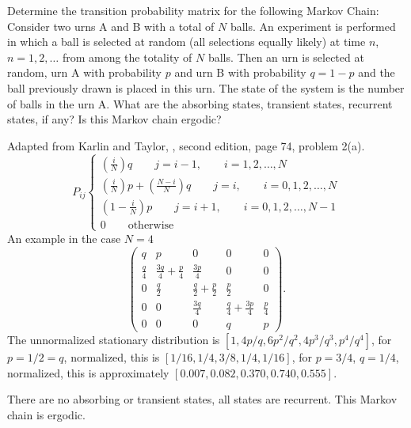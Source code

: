 \documentclass[12pt]{article}
\begin{document}
\begin{exercise}
    Determine the transition probability matrix for the following Markov
    Chain:  Consider two urns A and B with a total of \( N \) balls.  An
    experiment is performed in which a ball is selected at random (all
    selections equally likely) at time \( n \), \( n=1,2,\dots \) from
    among the totality of \( N \) balls.  Then an urn is selected at
    random, urn A with probability \( p \) and urn B with probability \(
    q = 1- p \) and the ball previously drawn is placed in this urn. The
    state of the system is the number of balls in the urn A. What are
    the absorbing states, transient states, recurrent states, if any?
    Is this Markov chain ergodic?
\end{exercise}
\begin{solution}
    Adapted from Karlin and Taylor, , second edition, page 74, problem 2(a).
    \[
        P_{ij}
        \begin{cases}
            \left( \frac{i}{N}\right)q \qquad j = i-1, \qquad i=1,2,\dots,N
            \\
            \left( \frac{i}{N} \right) p + \left( \frac{N-i}{N} \right)
            q \qquad j = i, \qquad i=0,1,2,\dots,N \\
            \left( 1- \frac{i}{N} \right) p \qquad j = i+1, \qquad
            i=0,1,2,\dots,N-1 \\
            0 \qquad \text{otherwise}
        \end{cases}
    \] An example in the case \( N=4 \)
    \[
        \begin{pmatrix}
            q & p & 0 & 0 & 0\\
            \frac{q}{4} & \frac{3q}{4}+\frac{p}{4} & \frac{3p}{4} & 0 &
            0\\
            0 & \frac{q}{2} & \frac{q}{2}+\frac{p}{2} & \frac{p}{2} & 0\\
            0 & 0 & \frac{3q}{4} & \frac{q}{4}+\frac{3p}{4} & \frac{p}{4}\\
            0 & 0 & 0 & q & p
        \end{pmatrix}
        .
    \] The unnormalized stationary distribution is \( [1, 4p/q, 6p^2/q^2,
    4p^3/q^3, p^4/q^4 ] \), for \( p = 1/2 = q \), normalized, this is \(
    [ 1/16, 1/4, 3/8, 1/4, 1/16] \), for \( p =3/4 \), \( q = 1/4 \),
    normalized, this is approximately \( [0.007, 0.082, 0.370, 0.740,
    0.555] \).

    There are no absorbing or transient states, all states are
    recurrent.  This Markov chain is ergodic.
  \end{solution}
  
\end{document}
